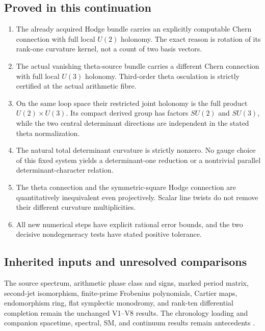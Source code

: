 \documentclass[11pt]{article}
\theoremstyle{definition}
\theoremstyle{remark}
\begin{document}
\subsection{Proved in this continuation}
\begin{enumerate}[label=\textup{(P9.\arabic*)},leftmargin=3.6em]
\item The already acquired Hodge bundle carries an explicitly computable
      Chern connection with full local $U(2)$ holonomy. The exact reason
      is rotation of its rank-one curvature kernel, not a count of two
      basis vectors.
\item The actual vanishing theta-source bundle carries a different Chern
      connection with full local $U(3)$ holonomy. Third-order theta
      osculation is strictly certified at the actual arithmetic fibre.
\item On the same loop space their restricted joint holonomy is the full
      product $U(2)\times U(3)$. Its compact derived group has factors
      $SU(2)$ and $SU(3)$, while the two central determinant directions
      are independent in the stated theta normalization.
\item The natural total determinant curvature is strictly nonzero. No
      gauge choice of this fixed system yields a determinant-one
      reduction or a nontrivial parallel determinant-character relation.
\item The theta connection and the symmetric-square Hodge connection are
      quantitatively inequivalent even projectively. Scalar line twists
      do not remove their different curvature multiplicities.
\item All new numerical steps have explicit rational error bounds, and
      the two decisive nondegeneracy tests have stated positive tolerance.
\end{enumerate}

\subsection{Inherited inputs and unresolved comparisons}
The source spectrum, arithmetic phase class and signs, marked period matrix,
second-jet isomorphism, finite-prime Frobenius polynomials, Cartier maps,
endomorphism ring, flat symplectic monodromy, and rank-ten differential
completion remain the unchanged V1--V8 results. The chronology loading and
companion spacetime, spectral, SM, and continuum results remain antecedents
\cite{GT77,Arithmetic,Spacetime,Spectral,Duality,Variational}.
\end{document}
